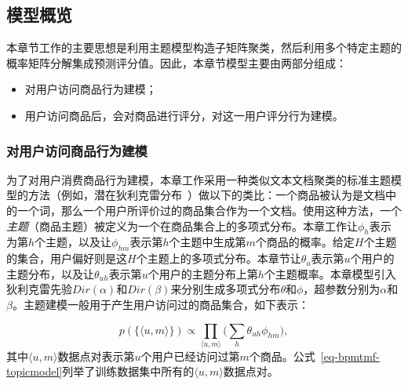 \subsection{模型概览}
\label{subsec-bpmtmf-model}
本章节工作的主要思想是利用主题模型构造子矩阵聚类，然后利用多个特定主题的概率矩阵分解集成预测评分值。因此，本章节模型主要由两部分组成：
\begin{itemize}
	\item 对用户访问商品行为建模；
	\item 用户访问商品后，会对商品进行评分，对这一用户评分行为建模。
\end{itemize}

\subsubsection{对用户访问商品行为建模} 
为了对用户消费商品行为建模，本章工作采用一种类似文本文档聚类的标准主题模型的方法（例如，潜在狄利克雷分布~\cite{blei2003latent}）做以下的类比：一个商品被认为是文档中的一个词，那么一个用户所评价过的商品集合作为一个文档。使用这种方法，一个\emph{主题}（\aka 商品主题）被定义为一个在商品集合上的多项式分布。本章工作让$\phi_h$表示为第$h$个主题，以及让$\phi_{hm}$表示第$h$个主题中生成第$m$个商品的概率。给定$H$个主题的集合，用户偏好则是这$H$个主题上的多项式分布。本章节让$\theta_u$表示第$u$个用户的主题分布，以及让$\theta_{uh}$表示第$u$个用户的主题分布上第$h$个主题概率。本章模型引入狄利克雷先验$Dir(\alpha)$和$Dir(\beta)$来分别生成多项式分布$\theta$和$\phi$，超参数分别为$\alpha$和$\beta$。主题建模一般用于产生用户访问过的商品集合，如下表示：

\begin{equation}
\label{eq-bpmtmf-topicmodel}
p(\{\langle u,m\rangle\}) \propto \prod_{\langle u,m\rangle} \bigg( \sum_{h} \theta_{uh}\phi_{hm} \bigg),
\end{equation}
其中$\langle u,m\rangle$数据点对表示第$u$个用户已经访问过第$m$个商品。公式~\ref{eq-bpmtmf-topicmodel}列举了训练数据集中所有的$\langle u,m\rangle$数据点对。

